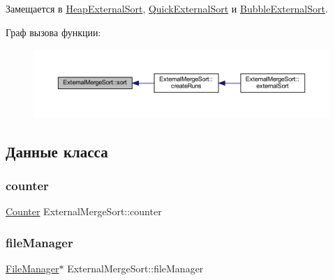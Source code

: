 Замещается в \hyperlink{class_heap_external_sort_a908087ce13932b268a35e1184a05ea44}{Heap\+External\+Sort}, \hyperlink{class_quick_external_sort_adafdd4faded04218c1a131bf55e3c90d}{Quick\+External\+Sort} и \hyperlink{class_bubble_external_sort_ac2c8c1a8dad0f0f99a176d3641b7625c}{Bubble\+External\+Sort}.

Граф вызова функции\+:\nopagebreak
\begin{figure}[H]
\begin{center}
\leavevmode
\includegraphics[width=350pt]{class_external_merge_sort_af6412221cc797a846243a343ccc12dba_icgraph}
\end{center}
\end{figure}


\subsection{Данные класса}
\hypertarget{class_external_merge_sort_ac9cb039a5cda56e66aecbc17465dd237}{}\label{class_external_merge_sort_ac9cb039a5cda56e66aecbc17465dd237} 
\subsubsection{\texorpdfstring{counter}{counter}}
{\footnotesize\ttfamily \hyperlink{class_counter}{Counter} External\+Merge\+Sort\+::counter}

\hypertarget{class_external_merge_sort_ab82d3b62a57be6c80dbd12b90de278e2}{}\label{class_external_merge_sort_ab82d3b62a57be6c80dbd12b90de278e2} 
\subsubsection{\texorpdfstring{file\+Manager}{fileManager}}
{\footnotesize\ttfamily \hyperlink{class_file_manager}{File\+Manager}$\ast$ External\+Merge\+Sort\+::file\+Manager\hspace{0.3cm}{\ttfamily [private]}}

